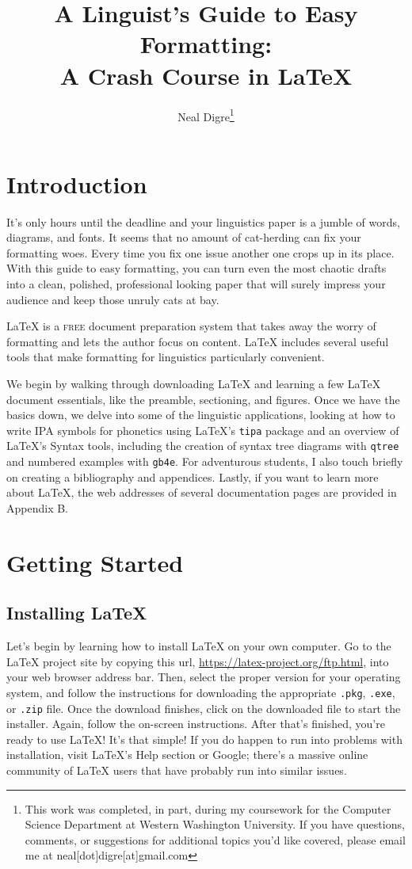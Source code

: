 \documentclass[12pt]{article}
\title{A Linguist's Guide to Easy Formatting: \\
\large A Crash Course in \LaTeX \vspace{-2ex}}
\author{Neal Digre\thanks{This work was completed, in part, during my coursework for the Computer Science Department at Western Washington University. If you have questions, comments, or suggestions for additional topics you'd like covered, please email me at neal[dot]digre[at]gmail.com} \vspace{-2ex}}
\date{}
\begin{document}
\maketitle
\pagestyle{fancy}

\section{Introduction}

It's only hours until the deadline and your linguistics paper is a jumble of words, diagrams, and fonts. It seems that no amount of cat-herding can fix your formatting woes. Every time you fix one issue another one crops up in its place. With this guide to easy formatting, you can turn even the most chaotic drafts into a clean, polished, professional looking paper that will surely impress your audience and keep those unruly cats at bay.

{\LaTeX} is a \textsc{free} document preparation system that takes away the worry of formatting and lets the author focus on content. {\LaTeX} includes several useful tools that make formatting for linguistics particularly convenient.

We begin by walking through downloading {\LaTeX} and learning a few {\LaTeX} document essentials, like the preamble, sectioning, and figures. Once we have the basics down, we delve into some of the linguistic applications, looking at how to write IPA symbols for phonetics using {\LaTeX}'s \verb!tipa! package and an overview of {\LaTeX}'s Syntax tools, including the creation of syntax tree diagrams with \verb!qtree! and numbered examples with \verb!gb4e!. For adventurous students, I also touch briefly on creating a bibliography and appendices. Lastly, if you want to learn more about {\LaTeX}, the web addresses of several documentation pages are provided in Appendix B.

\section{Getting Started} 
\subsection{Installing \LaTeX}

Let's begin by learning how to install {\LaTeX} on your own computer. Go to the {\LaTeX} project site by copying this url, \url{https://latex-project.org/ftp.html}, into your web browser address bar. Then, select the proper version for your operating system, and follow the instructions for downloading the appropriate \verb!.pkg!, \verb!.exe!, or \verb!.zip! file. Once the download finishes, click on the downloaded file to start the installer. Again, follow the on-screen instructions. After that's finished, you're ready to use {\LaTeX}! It's that simple! If you do happen to run into problems with installation, visit {\LaTeX}'s Help section or Google; there's a massive online community of {\LaTeX} users that have probably run into similar issues.
\end{document}
